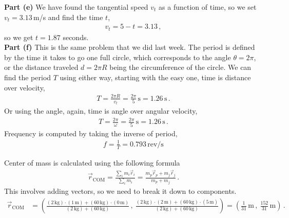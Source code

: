\documentclass[11pt]{article}
\begin{document}
\textbf{Part (e)} We have found the tangential speed $v_t$ as a function of time, so we set $v_t = 3.13$\,m/s and find the time $t$, 
\begin{align*}
v_t = 5-t = 3.13\,,
\end{align*}
so we get $t = 1.87$ seconds. \\

\textbf{Part (f)} This is the same problem that we did last week. The period is defined by the time it takes to go one full circle, which corresponds to the angle $\theta = 2\pi$, or the distance traveled $d = 2\pi R$ being the circumference of the circle. We can find the period $T$ using either way, starting with the easy one, time is distance over velocity,
\begin{align*}
T = \frac{2\pi R}{v_t} = \frac{2\pi}{5} \,\text{s}= 1.26\,\text{s}\,.
\end{align*}
Or using the angle, again, time is angle over angular velocity, 
\begin{align*}
T = \frac{2\pi}{\omega} = \frac{2\pi}{5}\,\text{s} = 1.26\,\text{s}\,.
\end{align*}
Frequency is computed by taking the inverse of period, 
\begin{align*}
f = \frac{1}{T} = 0.793 \,\text{rev/s}
\end{align*}

\newpage
Center of mass is calculated using the following formula
\begin{align*}
\vec{r}_{\text{COM}} = \frac{\sum_i m_i \vec{r}_i}{\sum_i m_i}= \frac{m_p \vec{r}_p + m_j \vec{r}_j}{m_p + m_j} \,.
\end{align*}
This involves adding vectors, so we need to break it down to components. 
\begin{align*}
\vec{r}_{\text{COM}} &= \left(
\frac{(2\,\text{kg})\cdot (1\,\text{m})+(60\,\text{kg})\cdot (0\,\text{m}) }{(2\,\text{kg})+(60\,\text{kg})}\,,\ 
\frac{(2\,\text{kg})\cdot (2\,\text{m})+(60\,\text{kg})\cdot (5\,\text{m}) }{(2\,\text{kg})+(60\,\text{kg})} 
\right)= \left(\frac{1}{31}\,\text{m}\,, \ \frac{152}{31}\,\text{m}\right)\,.
\end{align*}
\end{document}
